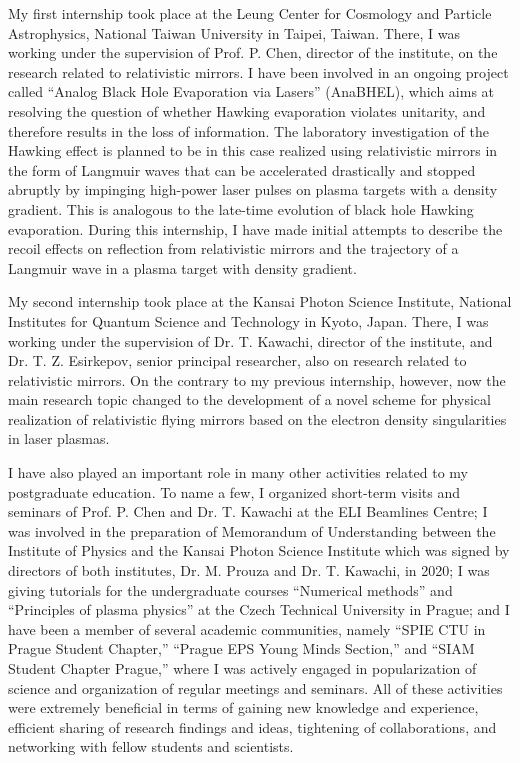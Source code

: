 \documentclass[10pt, a4paper, twoside, openright]{report}
\newcommand{\q}[1]{``#1''} %
\begin{document}
My first internship took place at the Leung Center for Cosmology and Particle Astrophysics, National Taiwan University in Taipei, Taiwan. There, I was working under the supervision of Prof. P. Chen, director of the institute, on the research related to relativistic mirrors. I have been involved in an ongoing project called \q{Analog Black Hole Evaporation via Lasers} (AnaBHEL), which aims at resolving the question of whether Hawking evaporation violates unitarity, and therefore results in the loss of information. The laboratory investigation of the Hawking effect is planned to be in this case realized using relativistic mirrors in the form of Langmuir waves that can be accelerated drastically and stopped abruptly by impinging high-power laser pulses on plasma targets with a density gradient. This is analogous to the late-time evolution of black hole Hawking evaporation. During this internship, I have made initial attempts to describe the recoil effects on reflection from relativistic mirrors and the trajectory of a Langmuir wave in a plasma target with density gradient.

My second internship took place at the Kansai Photon Science Institute, National Institutes for Quantum Science and Technology in Kyoto, Japan. There, I was working under the supervision of Dr. T. Kawachi, director of the institute, and Dr. T. Z. Esirkepov, senior principal researcher, also on research related to relativistic mirrors. On the contrary to my previous internship, however, now the main research topic changed to the development of a novel scheme for physical realization of relativistic flying mirrors based on the electron density singularities in laser plasmas. 

I have also played an important role in many other activities related to my postgraduate education. To name a few, I organized short-term visits and seminars of Prof. P. Chen and Dr. T. Kawachi at the ELI Beamlines Centre; I was involved in the preparation of Memorandum of Understanding between the Institute of Physics and the Kansai Photon Science Institute which was signed by directors of both institutes, Dr. M. Prouza and Dr. T. Kawachi, in 2020; I was giving tutorials for the undergraduate courses \q{Numerical methods} and \q{Principles of plasma physics} at the Czech Technical University in Prague; and I have been a member of several academic communities, namely \q{SPIE CTU in Prague Student Chapter,} \q{Prague EPS Young Minds Section,} and \q{SIAM Student Chapter Prague,} where I was actively engaged in popularization of science and organization of regular meetings and seminars. All of these activities were extremely beneficial in terms of gaining new knowledge and experience, efficient sharing of research findings and ideas, tightening of collaborations, and networking with fellow students and scientists.
\end{document}
